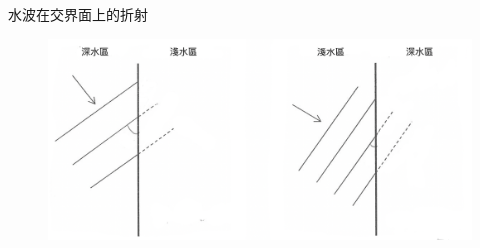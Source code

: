 \documentclass[13pt]{beamer}
\begin{document}
\begin{frame}{水波在交界面上的折射}
    \begin{figure}
        \centering
        \includegraphics[width=1\linewidth]{images/Screenshot 2023-09-27 at 8.16.07 PM.png}


    \end{figure}
\end{frame}
\end{document}
